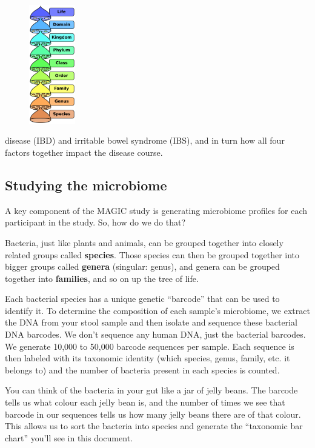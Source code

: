 \documentclass[
]{article}
\begin{document}
\begin{figure}
\begin{center}
\includegraphics[width=0.18\textwidth]{img/Biological_classification_L_Pengo_vflip.png}
\end{center}
\end{figure}

disease (IBD) and irritable bowel syndrome (IBS), and in turn how all
four factors together impact the disease course.

\subsection{Studying the microbiome}

A key component of the MAGIC study is generating microbiome profiles for
each participant in the study. So, how do we do that?

Bacteria, just like plants and animals, can be grouped together into
closely related groups called \textbf{species}. Those species can then
be grouped together into bigger groups called \textbf{genera} (singular:
genus), and genera can be grouped together into \textbf{families}, and
so on up the tree of life.

Each bacterial species has a unique genetic ``barcode'' that can be used
to identify it. To determine the composition of each sample's
microbiome, we extract the DNA from your stool sample and then isolate
and sequence these bacterial DNA barcodes. We don't sequence any human
DNA, just the bacterial barcodes. We generate 10,000 to 50,000 barcode
sequences per sample. Each sequence is then labeled with its taxonomic
identity (which species, genus, family, etc. it belongs to) and the
number of bacteria present in each species is counted.

You can think of the bacteria in your gut like a jar of jelly beans. The
barcode tells us what colour each jelly bean is, and the number of times
we see that barcode in our sequences tells us how many jelly beans there
are of that colour. This allows us to sort the bacteria into species and
generate the ``taxonomic bar chart'' you'll see in this document.
\end{document}
